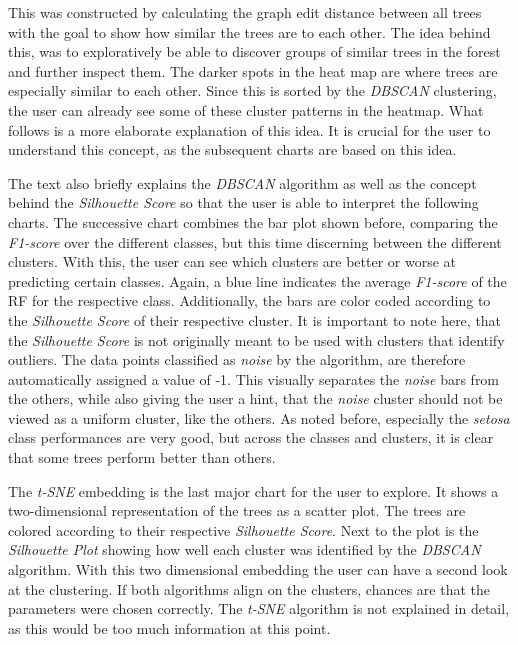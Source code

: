 \documentclass[a4paper, 12pt]{article}
\begin{document}
This was constructed by calculating the graph edit distance between all trees with the goal to show
how similar the trees are to each other. The idea behind this, was to exploratively be able to discover
groups of similar trees in the forest and further inspect them. The darker spots in the heat map are
where trees are especially similar to each other. Since this is sorted by the \textit{DBSCAN} clustering,
the user can already see some of these cluster patterns in the heatmap. What follows is a more
elaborate explanation of this idea. It is crucial for the user to understand this concept, as the
subsequent charts are based on this idea. \par
The text also briefly explains the \textit{DBSCAN} algorithm as well as the concept behind the
\textit{Silhouette Score} so that the user is able to interpret the following charts.
The successive chart combines the bar plot shown before, comparing the \textit{F1-score} over the
different classes, but this time discerning between the different clusters. With this, the user can
see which clusters are better or worse at predicting certain classes. Again, a blue line indicates
the average \textit{F1-score} of the RF for the respective class. Additionally, the bars are color
coded according to the \textit{Silhouette Score} of their respective cluster.
It is important to note here, that the \textit{Silhouette Score} is not originally meant to be used
with clusters that identify outliers. The data points classified as \textit{noise} by the algorithm,
are therefore automatically assigned a value of -1. This visually separates the \textit{noise} bars
from the others, while also giving the user a hint, that the \textit{noise} cluster should not be
viewed as a uniform cluster, like the others.
As noted before, especially the \textit{setosa} class performances are very good, but across the
classes and clusters, it is clear that some trees perform better than others.
\par
The \textit{t-SNE} embedding is the last major chart for the user to explore. It shows a two-dimensional
representation of the trees as a scatter plot. The trees are colored according to their respective
\textit{Silhouette Score}. Next to the plot is the \textit{Silhouette Plot} showing how well each
cluster was identified by the \textit{DBSCAN} algorithm. With this two dimensional embedding the user
can have a second look at the clustering. If both algorithms align
on the clusters, chances are that the parameters were chosen correctly. The \textit{t-SNE} algorithm
is not explained in detail, as this would be too much information at this point.
\end{document}
